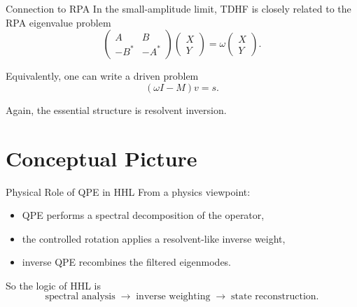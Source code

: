 \documentclass{beamer}
\begin{document}

\begin{frame}{Connection to RPA}
In the small-amplitude limit, TDHF is closely related to the RPA eigenvalue problem
\[
\begin{pmatrix}
A & B \\
-B^* & -A^*
\end{pmatrix}
\begin{pmatrix}
X \\ Y
\end{pmatrix}
=
\omega
\begin{pmatrix}
X \\ Y
\end{pmatrix}.
\]

Equivalently, one can write a driven problem
\[
(\omega I-M)v=s.
\]

Again, the essential structure is resolvent inversion.
\end{frame}

\section{Conceptual Picture}

\begin{frame}{Physical Role of QPE in HHL}
From a physics viewpoint:
\begin{itemize}
\item QPE performs a spectral decomposition of the operator,
\item the controlled rotation applies a resolvent-like inverse weight,
\item inverse QPE recombines the filtered eigenmodes.
\end{itemize}

So the logic of HHL is
\[
\text{spectral analysis}
\;\rightarrow\;
\text{inverse weighting}
\;\rightarrow\;
\text{state reconstruction}.
\]
\end{frame}

\end{document}

